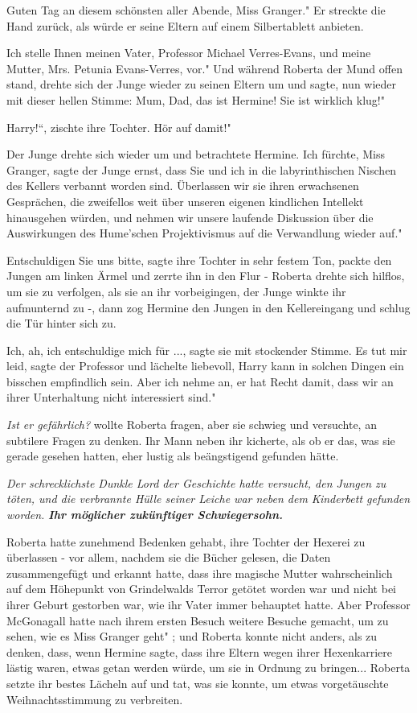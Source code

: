 \glqq Guten Tag an diesem schönsten aller Abende, Miss Granger." Er streckte die
Hand zurück, als würde er seine Eltern auf einem Silbertablett anbieten.

\glqq Ich stelle Ihnen meinen Vater, Professor Michael Verres-Evans, und meine
Mutter, Mrs. Petunia Evans-Verres, vor." Und während Roberta der Mund offen
stand, drehte sich der Junge wieder zu seinen Eltern um und sagte, nun wieder
mit dieser hellen Stimme: \glqq Mum, Dad, das ist Hermine! Sie ist wirklich
klug!"

\glqq Harry!“, zischte ihre Tochter. \glqq Hör auf damit!"

Der Junge drehte sich wieder um und betrachtete Hermine. \glqq Ich fürchte, Miss
Granger\grqq{}, sagte der Junge ernst, \glqq dass Sie und ich in die
labyrinthischen Nischen des Kellers verbannt worden sind. Überlassen wir sie
ihren erwachsenen Gesprächen, die zweifellos weit über unseren eigenen
kindlichen Intellekt hinausgehen würden, und nehmen wir unsere laufende
Diskussion über die Auswirkungen des Hume'schen Projektivismus auf die
Verwandlung wieder auf."

\glqq Entschuldigen Sie uns bitte\grqq{}, sagte ihre Tochter in sehr festem Ton,
packte den Jungen am linken Ärmel und zerrte ihn in den Flur - Roberta drehte
sich hilflos, um sie zu verfolgen, als sie an ihr vorbeigingen, der Junge winkte
ihr aufmunternd zu -, dann zog Hermine den Jungen in den Kellereingang und
schlug die Tür hinter sich zu.

\glqq Ich, ah, ich entschuldige mich für ...\grqq{}, sagte sie mit stockender
Stimme. \glqq Es tut mir leid\grqq{}, sagte der Professor und lächelte
liebevoll, \glqq Harry kann in solchen Dingen ein bisschen empfindlich sein.
Aber ich nehme an, er hat Recht damit, dass wir an ihrer Unterhaltung nicht
interessiert sind."

\emph{ Ist er gefährlich?} wollte Roberta fragen, aber sie schwieg und
versuchte, an subtilere Fragen zu denken. Ihr Mann neben ihr kicherte, als ob er
das, was sie gerade gesehen hatten, eher lustig als beängstigend gefunden hätte.

\emph{ Der schrecklichste Dunkle Lord der Geschichte hatte versucht, den Jungen zu töten, und die verbrannte Hülle seiner Leiche war neben dem Kinderbett gefunden worden.}
\textbf{\emph{ Ihr möglicher zukünftiger Schwiegersohn. }}

Roberta hatte zunehmend Bedenken gehabt, ihre Tochter der Hexerei zu überlassen
- vor allem, nachdem sie die Bücher gelesen, die Daten zusammengefügt und
erkannt hatte, dass ihre magische Mutter wahrscheinlich auf dem Höhepunkt von
Grindelwalds Terror getötet worden war und nicht bei ihrer Geburt gestorben war,
wie ihr Vater immer behauptet hatte. Aber Professor McGonagall hatte nach ihrem
ersten Besuch weitere Besuche gemacht, um \glqq zu sehen, wie es Miss Granger
geht" ; und Roberta konnte nicht anders, als zu denken, dass, wenn Hermine
sagte, dass ihre Eltern wegen ihrer Hexenkarriere lästig waren, etwas getan
werden würde, um sie in Ordnung zu bringen... Roberta setzte ihr bestes Lächeln
auf und tat, was sie konnte, um etwas vorgetäuschte Weihnachtsstimmung zu
verbreiten.

